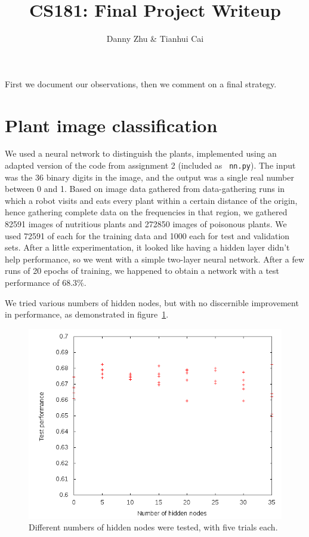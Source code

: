 \documentclass{article}
\title{CS181: Final Project Writeup}
\author{Danny Zhu \& Tianhui Cai}
\begin{document}
\maketitle
First we document our observations, then we comment on
a final strategy.

\section{Plant image classification}
We used a neural network to distinguish the plants, implemented using
an adapted version of the code from assignment 2 (included as {\tt
  nn.py}). The input was the 36 binary digits in the image, and the
output was a single real number between 0 and 1.  Based on image data
gathered from data-gathering runs in which a robot visits and eats
every plant within a certain distance of the origin, hence gathering
complete data on the frequencies in that region, we gathered 82591
images of nutritious plants and 272850 images of poisonous plants. We
used 72591 of each for the training data and 1000 each for test and
validation sets. After a little experimentation, it looked like having
a hidden layer didn't help performance, so we went with a simple
two-layer neural network. After a few runs of 20 epochs of training,
we happened to obtain a network with a test performance of $68.3\%$.

We tried various numbers of hidden nodes, but with no discernible
improvement in performance, as demonstrated in figure~\ref{fig:hidden}.

\begin{figure}
  \includegraphics[width=.8\columnwidth]{hid.png}
  \caption{Different numbers of hidden nodes were tested, with five
    trials each.}
  \label{fig:hidden}
\end{figure}
\end{document}
